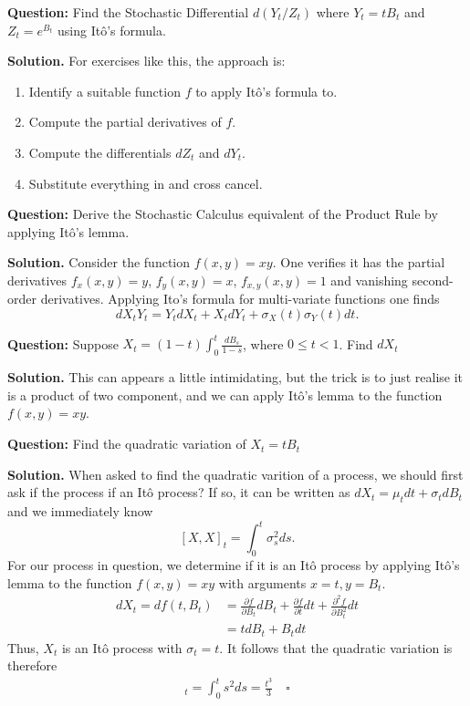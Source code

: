 \documentclass{article}
\begin{document}
\begin{tcolorbox}[colframe=black,colback=gray!5,boxrule=0.5pt]
\textbf{Question:} Find the Stochastic Differential $d(Y_t / Z_t)$ where $Y_t = tB_t$ and $Z_t=e^{B_t}$ using Itô's formula. \cite{Fima}
\end{tcolorbox}
\textbf{Solution.} For exercises like this, the approach is: 
\begin{enumerate}
    \item Identify a suitable function $f$ to apply Itô's formula to. 
    \item Compute the partial derivatives of $f$. 
    \item Compute the differentials $dZ_t$ and $dY_t$. 
    \item Substitute everything in and cross cancel. 
\end{enumerate}


\begin{tcolorbox}[colframe=black,colback=gray!5,boxrule=0.5pt]
\textbf{Question:} Derive the Stochastic Calculus equivalent of the Product Rule by applying Itô's lemma. 
\end{tcolorbox}
\textbf{Solution.} Consider the function $f(x,y) = xy$. One verifies it has the partial derivatives $f_x(x,y)=y$, $f_y(x,y)=x$, $f_{x,y}(x,y)=1$ and vanishing second-order derivatives. Applying Ito's formula for multi-variate functions one finds
$$dX_tY_t = Y_tdX_t + X_tdY_t + \sigma_X(t)\sigma_Y(t)dt.$$

\begin{tcolorbox}[colframe=black,colback=gray!5,boxrule=0.5pt]
\textbf{Question:} Suppose $X_t = (1-t)\int_0^t\frac{dB_s}{1-s}$, where $0\leq t<1$. Find $dX_t$
\end{tcolorbox}
\textbf{Solution.} This can appears a little intimidating, but the trick is to just realise it is a product of two component, and we can apply Itô's lemma to the function $f(x,y) = xy$.


\begin{tcolorbox}[colframe=black,colback=gray!5,boxrule=0.5pt]
\textbf{Question:} Find the quadratic variation of $X_t = tB_t$
\end{tcolorbox}
\textbf{Solution.} When asked to find the quadratic varition of a process, we should first ask if the process if an Itô process? If so, it can be written as $dX_t = \mu_t dt + \sigma_t dB_t$ and we immediately know 
$$[X, X]_t = \int_0^t\sigma_s^2ds.$$
For our process in question, we determine if it is an Itô process by applying Itô's lemma to the function $f(x,y) = xy$ with arguments $x=t, y=B_t$. 
\begin{align*}
    dX_t = df(t,B_t) &= \frac{\partial f}{\partial B_t}dB_t + \frac{\partial f}{\partial t}dt + \frac{\partial^2 f}{\partial B_t^2}dt \\
    &=tdB_t + B_tdt
\end{align*}
Thus, $X_t$ is an Itô process with $\sigma_t = t$. It follows that the quadratic variation is therefore
\begin{align*}
    [X,X]_t = \int_0^t s^2ds = \frac{t^3}{3} \quad \square
\end{align*}
\end{document}
